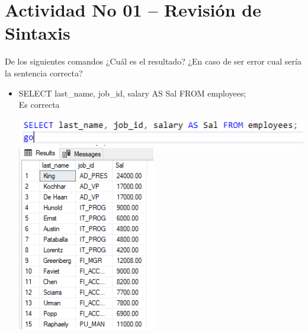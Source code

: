 \section{Actividad No 01 – Revisi\'on de Sintaxis} 
De los siguientes comandos ¿Cuál es el resultado? ¿En caso de ser error cual sería la sentencia correcta?

\begin{itemize}
	\item SELECT last\_name, job\_id, salary AS Sal FROM employees;
	\\Es correcta
	\begin{center}
	\includegraphics[width=15cm]{./Imagenes/actividad_01_01a} 
	\includegraphics[width=6cm]{./Imagenes/actividad_01_01} 
	\end{center}


\end{itemize}

